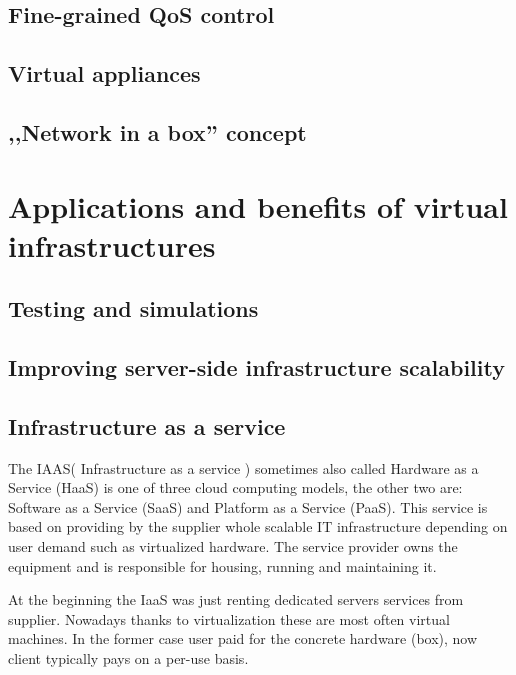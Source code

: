\documentclass[11pt]{book}
\begin{document}
      \subsection{Fine-grained QoS control}

      \subsection{Virtual appliances}

      \subsection{,,Network in a box'' concept}


    \section{Applications and benefits of virtual infrastructures}

      \subsection{Testing and simulations}

      \subsection{Improving server-side infrastructure scalability}

      \subsection{Infrastructure as a service}
	  
	  The IAAS( Infrastructure as a service ) sometimes also called Hardware as a Service (HaaS) is one of three 
	  cloud computing models, the other two are: Software as a Service (SaaS) and Platform as a Service (PaaS). 
	  This service is based on providing by the supplier whole scalable IT infrastructure depending on user demand 
	  such as virtualized hardware. The service provider owns the equipment and is responsible for housing,
	  running and maintaining it.  
	  
	  At the beginning the IaaS was just renting dedicated servers services from supplier. Nowadays thanks to virtualization 
	  these are most often virtual machines. In the former case user paid for the concrete hardware (box), now client 
	  typically pays on a per-use basis.
\end{document}
